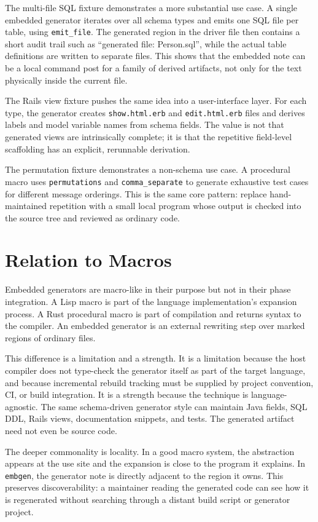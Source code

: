 \documentclass[11pt]{article}
\begin{document}
The multi-file SQL fixture demonstrates a more substantial use case.  A single
embedded generator iterates over all schema types and emits one SQL file per
table, using \texttt{emit\_file}.  The generated region in the driver file then
contains a short audit trail such as ``generated file: Person.sql'', while the
actual table definitions are written to separate files.  This shows that the
embedded note can be a local command post for a family of derived artifacts, not
only for the text physically inside the current file.

The Rails view fixture pushes the same idea into a user-interface layer.  For
each type, the generator creates \texttt{show.html.erb} and
\texttt{edit.html.erb} files and derives labels and model variable names from
schema fields.  The value is not that generated views are intrinsically
complete; it is that the repetitive field-level scaffolding has an explicit,
rerunnable derivation.

The permutation fixture demonstrates a non-schema use case.  A procedural macro
uses \texttt{permutations} and \texttt{comma\_separate} to generate exhaustive
test cases for different message orderings.  This is the same core pattern:
replace hand-maintained repetition with a small local program whose output is
checked into the source tree and reviewed as ordinary code.

\section{Relation to Macros}

Embedded generators are macro-like in their purpose but not in their phase
integration.  A Lisp macro is part of the language implementation's expansion
process.  A Rust procedural macro is part of compilation and returns syntax to
the compiler.  An embedded generator is an external rewriting step over marked
regions of ordinary files.

This difference is a limitation and a strength.  It is a limitation because the
host compiler does not type-check the generator itself as part of the target
language, and because incremental rebuild tracking must be supplied by project
convention, CI, or build integration.  It is a strength because the technique is
language-agnostic.  The same schema-driven generator style can maintain Java
fields, SQL DDL, Rails views, documentation snippets, and tests.  The generated
artifact need not even be source code.

The deeper commonality is locality.  In a good macro system, the abstraction
appears at the use site and the expansion is close to the program it explains.
In \texttt{embgen}, the generator note is directly adjacent to the region it
owns.  This preserves discoverability: a maintainer reading the generated code
can see how it is regenerated without searching through a distant build script
or generator project.
\end{document}
